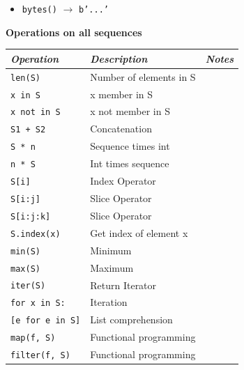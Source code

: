 \documentclass[9pt,a4wide]{extarticle}
\begin{document}
\begin{itemize}
\item {\tt bytes()} $\rightarrow$ {\tt b'...'}
\end{itemize}




\bigskip
{\bf Operations on all sequences}

\begin{supertabular}{|l|p{12cm}|c|}\hline
{\em Operation}      & {\em Description}        &  {\em Notes} \\ \hline\hline

{\tt len(S)}         & Number of elements in S  &        \\ \hline
{\tt x in S}         & x member in S            &        \\ \hline
{\tt x not in S}     & x not member in S        &        \\ \hline
{\tt S1 + S2}        & Concatenation                       &        \\ \hline
{\tt S * n}          & Sequence times int                  &        \\ \hline
{\tt n * S}          & Int times sequence                  &        \\ \hline
{\tt S[i]}           & Index Operator                      &        \\ \hline
{\tt S[i:j]}         & Slice Operator                      &        \\ \hline
{\tt S[i:j:k]}       & Slice Operator                      &        \\ \hline
{\tt S.index(x)}     & Get index of element x              &        \\ \hline
{\tt min(S)}         & Minimum                             &        \\ \hline
{\tt max(S)}         & Maximum                             &        \\ \hline
{\tt iter(S)}        & Return Iterator                     &        \\ \hline
{\tt for x in S:}    & Iteration                           &        \\ \hline
{\tt [e for e in S]} & List comprehension                  &        \\ \hline
{\tt map(f, S)}      & Functional programming              &        \\ \hline
{\tt filter(f, S)}   & Functional programming              &        \\ \hline
\end{supertabular}
\end{document}
